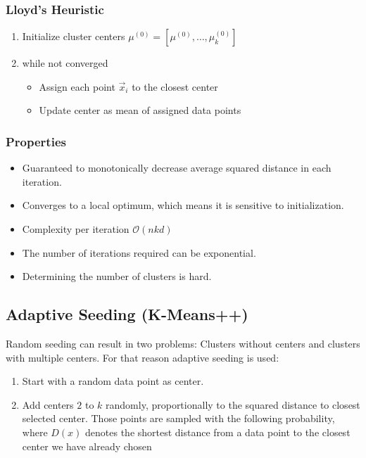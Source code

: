 \documentclass[8pt,a4paper]{scrartcl}
\begin{document}
\begin{multicols*}{3}
\subsubsection{Lloyd's Heuristic}

\begin{enumerate}
\ncompaq
\item Initialize cluster centers $\mu^{(0)}=[\mu^{(0)},\ldots,\mu_k^{(0)}]$
\item while not converged
\begin{itemize}
\ncompaq
\item Assign each point $\vec{x}_i$ to the closest center

\item Update center as mean of assigned data points
\end{itemize}
\end{enumerate}

\subsubsection{Properties}

\begin{itemize}
\ncompaq
\item Guaranteed to monotonically decrease average squared distance in each iteration.
\item Converges to a local optimum, which means it is sensitive to initialization.
\item Complexity per iteration $\mathcal{O}(nkd)$
\item The number of iterations required can be exponential.
\item Determining the number of clusters is hard.
\end{itemize}

\subsection{Adaptive Seeding (K-Means++)}

Random seeding can result in two problems: Clusters without centers and clusters with multiple centers. For that reason adaptive seeding is used:

\begin{enumerate}
\ncompaq
\item Start with a random data point as center.
\item Add centers $2$ to $k$ randomly, proportionally to the squared distance to closest selected center. Those points are sampled with the following probability, where $D(x)$ denotes the shortest distance from a data point to the closest center we have already chosen


\end{enumerate}
\end{multicols*}
\end{document}
